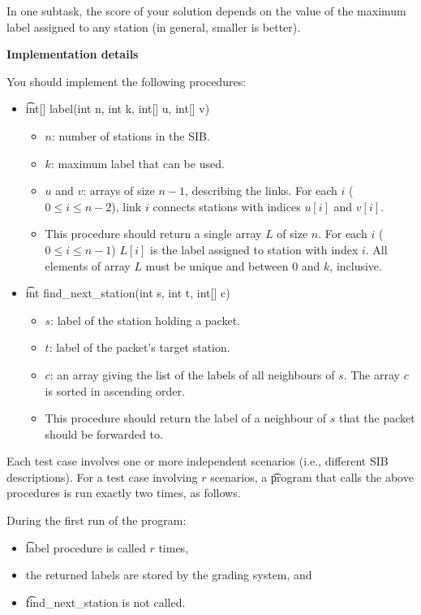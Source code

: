In one subtask, the score of your solution depends on the value of the maximum label assigned to any station (in general, smaller is better).

\textbf{Implementation details}

You should implement the following procedures:

\begin{itemize}
\item \t{int[] label(int n, int k, int[] u, int[] v)}
\begin{itemize}
\item $n$: number of stations in the SIB.
\item $k$: maximum label that can be used.
\item $u$ and $v$:  arrays of size $n-1$, describing the links. For each $i$ ($0 \leq i \leq n-2$), link $i$ connects stations with indices $u[i]$ and $v[i]$.
\item This procedure should return a single array $L$ of size $n$. For each $i$ ($0 \leq i \leq n-1$) $L[i]$ is the label assigned to station with index $i$. All elements of array $L$ must be unique and between $0$ and $k$, inclusive.
\end{itemize}
\item \t{int find\_next\_station(int s, int t, int[] c)}
\begin{itemize}

\item $s$: label of the station holding a packet.
\item $t$: label of the packet's target station.
\item $c$: an array giving the list of the labels of all neighbours of $s$. The array $c$ is sorted in ascending order.
\item This procedure should return the label of a neighbour of $s$ that the packet should be forwarded to.
\end{itemize}
\end{itemize}

Each test case involves one or more independent scenarios (i.e., different SIB descriptions). For a test case involving $r$ scenarios, a \t{program} that calls the above procedures is run exactly two times,
as follows.

During the first run of the program:
\begin{itemize}
\item \t{label} procedure is called $r$ times,
\item the returned labels are stored by the grading system, and
\item \t{find\_next\_station} is not called.
\end{itemize}


